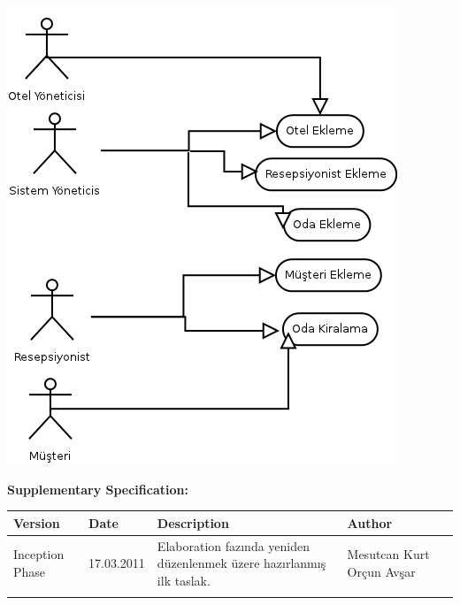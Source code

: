 \documentclass[12pt,a4paper]{report}
\begin{document}
\newpage

\includegraphics{dia/userroles.png}

\newpage
{
\bf
Supplementary Specification: \\[1cm]
}
\begin{tabular}{ |p{2.5cm} | p{2cm} | p{7cm} | p{2.7cm} | }

\hline
\bf
Version
&
\bf
Date
&
\bf
Description
&
\bf
Author \\
\hline

Inception Phase
&
17.03.2011
&
Elaboration fazında yeniden düzenlenmek üzere hazırlanmış ilk taslak.
&
Mesutcan Kurt
Orçun Avşar \\
\hline

&

&

&

&

\hline

\end{tabular}

\newpage
\end{document}
